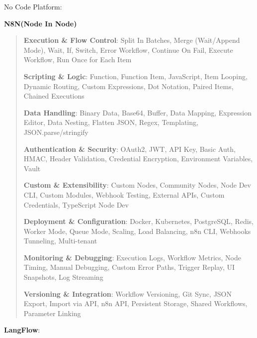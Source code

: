 \documentclass[a4paper]{article}
\begin{document}
No Code Platform:

\textbf{N8N(Node In Node)}

\begin{quote}
\textbf{Execution \& Flow Control}: Split In Batches, Merge (Wait/Append
Mode), Wait, If, Switch, Error Workflow, Continue On Fail, Execute
Workflow, Run Once for Each Item

\textbf{Scripting \& Logic}: Function, Function Item, JavaScript, Item
Looping, Dynamic Routing, Custom Expressions, Dot Notation, Paired
Items, Chained Executions

\textbf{Data Handling}: Binary Data, Base64, Buffer, Data Mapping,
Expression Editor, Data Nesting, Flatten JSON, Regex, Templating,
JSON.parse/stringify

\textbf{Authentication \& Security}: OAuth2, JWT, API Key, Basic Auth,
HMAC, Header Validation, Credential Encryption, Environment Variables,
Vault

\textbf{Custom \& Extensibility}: Custom Nodes, Community Nodes, Node
Dev CLI, Custom Modules, Webhook Testing, External APIs, Custom
Credentials, TypeScript Node Dev

\textbf{Deployment \& Configuration}: Docker, Kubernetes, PostgreSQL,
Redis, Worker Mode, Queue Mode, Scaling, Load Balancing, n8n CLI,
Webhooks Tunneling, Multi-tenant

\textbf{Monitoring \& Debugging}: Execution Logs, Workflow Metrics, Node
Timing, Manual Debugging, Custom Error Paths, Trigger Replay, UI
Snapshots, Log Streaming

\textbf{Versioning \& Integration}: Workflow Versioning, Git Sync, JSON
Export, Import via API, n8n API, Persistent Storage, Shared Workflows,
Parameter Linking
\end{quote}

\textbf{LangFlow}:
\end{document}
